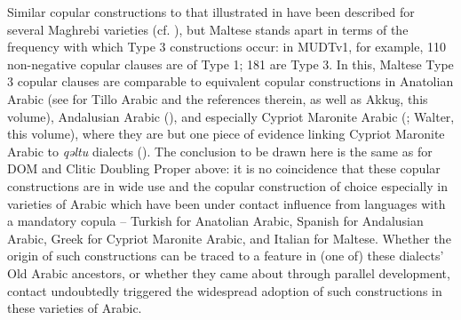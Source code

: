 \documentclass[output=paper]{langsci/langscibook}
\begin{document}
Similar copular constructions to that illustrated in  have been described for several Maghrebi varieties (cf. \citealt[355]{Vanhove1993}), but Maltese stands apart in terms of the frequency with which Type 3 constructions occur: in MUDTv1, for example, 110 non-negative copular clauses are of Type 1; 181 are Type 3. In this, Maltese Type 3 copular clauses are comparable to equivalent copular constructions in Anatolian Arabic (see \citealt[172--173]{Lahdo2009} for Tillo Arabic and the references therein, as well as Akkuş, this volume), Andalusian Arabic (\citealt[105]{Andalusi2013}), and especially Cypriot Maronite Arabic (\citealt[135]{Borg1985}; Walter, this volume), where they are but one piece of evidence linking Cypriot Maronite Arabic to \textit{qəltu} dialects (\citealt[31]{Borg2004}). The conclusion to be drawn here is the same as for DOM and Clitic Doubling Proper above: it is no coincidence that these copular constructions are in wide use and the copular construction of choice especially in varieties of Arabic which have been under contact influence from languages with a mandatory copula -- Turkish for Anatolian Arabic, Spanish for Andalusian Arabic, Greek for Cypriot Maronite Arabic, and Italian for Maltese. Whether the origin of such constructions can be traced to a feature in (one of) these dialects' Old Arabic ancestors, or whether they came about through parallel development, contact undoubtedly triggered the widespread adoption of such constructions in these varieties of Arabic.
\end{document}
